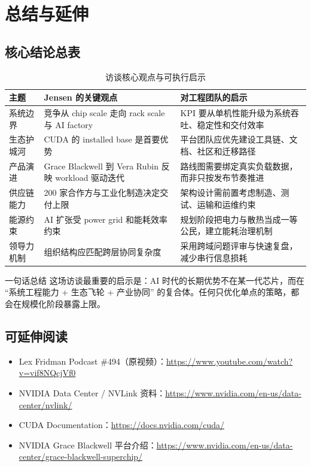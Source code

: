 \section{总结与延伸}

\subsection{核心结论总表}

\begin{table}[H]
\centering
\caption{访谈核心观点与可执行启示}
\begin{tabular}{p{} p{} p{}}
\toprule
主题 & Jensen 的关键观点 & 对工程团队的启示 \\
\midrule
系统边界 & 竞争从 chip scale 走向 rack scale 与 AI factory & KPI 要从单机性能升级为系统吞吐、稳定性和交付效率 \\
\addlinespace
生态护城河 & CUDA 的 installed base 是首要优势 & 平台团队应优先建设工具链、文档、社区和迁移路径 \\
\addlinespace
产品演进 & Grace Blackwell 到 Vera Rubin 反映 workload 驱动迭代 & 路线图需要绑定真实负载数据，而非只按发布节奏推进 \\
\addlinespace
供应链能力 & 200 家合作方与工业化制造决定交付上限 & 架构设计需前置考虑制造、测试、运输和运维约束 \\
\addlinespace
能源约束 & AI 扩张受 power grid 和能耗效率约束 & 规划阶段把电力与散热当成一等公民，建立能耗治理机制 \\
\addlinespace
领导力机制 & 组织结构应匹配跨层协同复杂度 & 采用跨域问题评审与快速复盘，减少串行信息损耗 \\
\bottomrule
\end{tabular}
\end{table}

\begin{importantbox}{一句话总结}
这场访谈最重要的启示是：AI 时代的长期优势不在某一代芯片，而在 ``系统工程能力 + 生态飞轮 + 产业协同'' 的复合体。任何只优化单点的策略，都会在规模化阶段暴露上限。
\end{importantbox}

\subsection{可延伸阅读}

\begin{itemize}
    \item Lex Fridman Podcast \#494（原视频）：\url{https://www.youtube.com/watch?v=vif8NQcjVf0}
    \item NVIDIA Data Center / NVLink 资料：\url{https://www.nvidia.com/en-us/data-center/nvlink/}
    \item CUDA Documentation：\url{https://docs.nvidia.com/cuda/}
    \item NVIDIA Grace Blackwell 平台介绍：\url{https://www.nvidia.com/en-us/data-center/grace-blackwell-superchip/}
\end{itemize}



